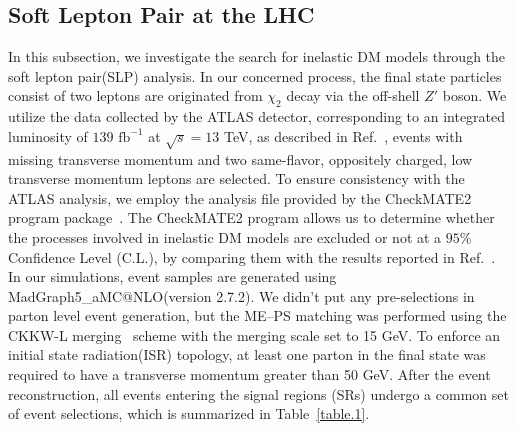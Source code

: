 \documentclass[preprint, superscriptaddress,amsmath, nofootinbib]{revtex4-1}
\begin{document}
\subsection{Soft Lepton Pair at the LHC}
\label{subsec:4c}
In this subsection, we investigate the search for inelastic DM models through the soft lepton pair(SLP) analysis. In our concerned process, the final state particles consist of two leptons are originated from $\chi_{2}$ decay via the off-shell $Z'$ boson. We utilize the data collected by the ATLAS detector, corresponding to an integrated luminosity of $\text{139 fb}^{-1}$ at $\sqrt{s} = \text{13}$ TeV, as described in Ref.~\cite{ATLAS:2019lng}, events with missing transverse momentum and two same-flavor, oppositely charged, low transverse momentum leptons are selected. To ensure consistency with the ATLAS analysis, we employ the analysis file provided by the \textsf{CheckMATE2} program package~\cite{Dercks:2016npn}. The \textsf{CheckMATE2} program allows us to determine whether the processes involved in inelastic DM models are excluded or not at a $95\%$ Confidence Level (C.L.), by comparing them with the results reported in Ref.~\cite{ATLAS:2019lng}. 
In our simulations, event samples are generated using \textsf{MadGraph5\_aMC@NLO}(version 2.7.2). We didn't put any pre-selections in parton level event generation, but the ME–PS matching was performed using the CKKW-L merging~\cite{Lonnblad:2011xx} scheme with the merging scale set to 15 GeV. To enforce an initial state radiation(ISR) topology, at least one parton in the final state was required to have a transverse momentum greater than 50 GeV. 
After the event reconstruction, all events entering the signal regions (SRs) undergo a common set of event selections, which is summarized in Table~\ref{table.1}.
\end{document}
